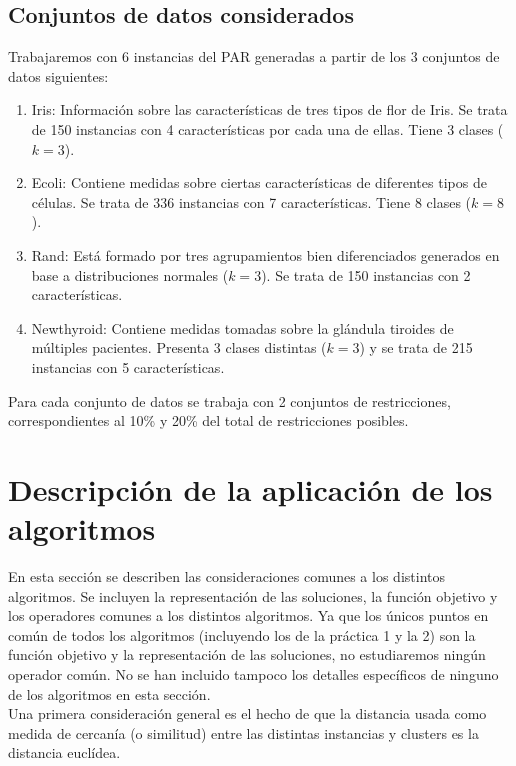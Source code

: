 \documentclass[11pt,a4paper]{article}
\begin{document}
	\subsection{Conjuntos de datos considerados}
	Trabajaremos con 6 instancias del PAR generadas a partir de los 3 conjuntos de datos siguientes:
	\begin{enumerate}
        \item Iris: Información sobre las características de tres tipos de flor de Iris. Se trata de 150 instancias con 4 características por cada una de ellas. Tiene 3 clases ($k = 3$).
        \item Ecoli: Contiene medidas sobre ciertas características de diferentes tipos de células. Se trata de 336 instancias con 7 características. Tiene 8 clases ($k = 8$).
        \item Rand: Está formado por tres agrupamientos bien diferenciados generados en base a distribuciones normales ($k = 3$). Se trata de 150 instancias con 2 características.
        \item Newthyroid: Contiene medidas tomadas sobre la glándula tiroides de múltiples pacientes. Presenta 3 clases distintas ($k = 3$) y se trata de 215 instancias con 5 características.
  \end{enumerate}
    
    Para cada conjunto de datos se trabaja con 2 conjuntos de restricciones, correspondientes al 10\% y 20\% del total de restricciones posibles.
	
	
	\section{Descripción de la aplicación de los algoritmos}\label{sec:comun}
	
	En esta sección se describen las consideraciones comunes a los distintos algoritmos. Se incluyen la representación de las soluciones, la función objetivo y los operadores comunes a los distintos algoritmos. Ya que los únicos puntos en común de todos los algoritmos (incluyendo los de la práctica 1 y la 2) son la función objetivo y la representación de las soluciones, no estudiaremos ningún operador común. No se han incluido tampoco los detalles específicos de ninguno de los algoritmos en esta sección.  \\
	
	Una primera consideración general es el hecho de que la distancia usada como medida de cercanía (o similitud) entre las distintas instancias y clusters es la distancia euclídea. \\
	
\end{document}
